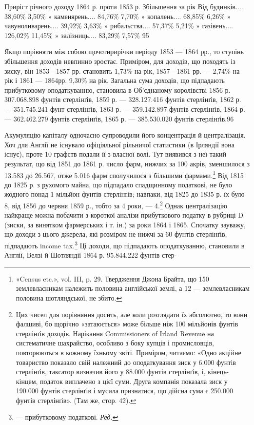Приріст річного доходу 1864 р. проти 1853 р. Збільшення за рік
Від    будинків....                           38,60\%
      3,50\%
» каменярень....                             84,76\%
    7,70\%
» копалень....                                 68,85\%
 6,26\%
» чавуноливарень....                      39,92\%                                               3,63\%
» рибальства....                              57,37\%
5,21\%
» газівень....                                 126,02\%
 11,45\%
» залізниць....                                    83,29\%
  7,57\% 95

Якщо порівняти між собою щочотирирічки періоду 1853 —
1864 рр., то ступінь збільшення доходів невпинно зростає. Приміром,
для доходів, що походять із зиску, він 1853—1857 рр.
становить 1,73\% на рік, 1857—1861 рр. — 2,74\% на рік і 1861 —
1864рр. 9,30\% на рік. Загальна сума доходів, що підпадають прибутковому
оподаткуванню, становила в Об’єднаному королівстві
1856 р. 307.068.898 фунтів стерлінґів, 1859 р. — 328.127.416 фунтів
стерлінґів, 1862 р. — 351.745.241 фунт стерлінґів, 1863 р. —
359.142.897 фунтів стерлінґів, 1864 р. — 362.462.279 фунтів стерлінґів,
1865 р. — 385.530.020 фунтів стерлінґів.96

Акумуляцію капіталу одночасно супроводили його концентрація
й централізація. Хоч для Англії не існувало офіціяльної
рільничої статистики (в Ірляндії вона існує), проте 10 графств подали
її з власної волі. Тут виявився з неї такий результат, що від
1851 до 1861 р. число фарм, нижчих за 100 акрів, зменшилося з
13.583 до 26.567, отже 5.016 фарм сполучилося з більшими фармами.\footnote{
«Census etc.», vol. III, p. 29. Твердження Джона Брайта, що 150
землевласникам належить половина англійської землі, а 12 — землевласникам
половина шотляндської, не збито.
}  Від 1815 до 1825 р. з рухомого майна, що підпадало спадщинному
податкові, не було жодного понад 1 мільйон фунтів стерлінґів;
навпаки, від 1825 до 1835 р. їх було 8, від 1856 до червня
1859 р., тобто за 4 роки, — 4.\footnote{
Цих чисел для порівняння досить, але коли розглядати їх абсолютно,
то вони фалшиві, бо щорічно «затаюється» може більше ніж
100 мільйонів фунтів стерлінґів доходів. Нарікання Commissioners of Irland
Revenue на систематичне шахрайство, особливо з боку купців і промисловців,
повторюються в кожному їхньому звіті. Приміром, читаємо:
«Одно акційне товариство показало свій належний до оподаткування зиск
у 6.000 фунтів стерлінґів, таксатор визначив його у 88.000 фунтів стерлінґів,
і, кінець-кінцем, податок виплачено з цієї суми. Друга компанія
показала зиск у 190.000 фунтів стерлінґів і мусила признатися, що
дійсна сума є 250.000 фунтів стерлінґів». (Там же, стор. 42).
} Однак централізацію найкраще
можна побачити з короткої аналізи прибуткового податку
в рубриці D (зиски, за винятком фармерських і т. ін.) за роки
1864 і 1865. Спочатку зауважу, що доходи з цього джерела,
які розміром не нижчі за 60 фунтів стерлінґів, підпадають
income tax.\footnote*{
— прибутковому податкові. \emph{Ред.}
} Ці доходи, що підпадають оподаткуванню, становили
в Англії, Велзі й Шотляндії 1864 р. 95.844.222 фунтів стер-

